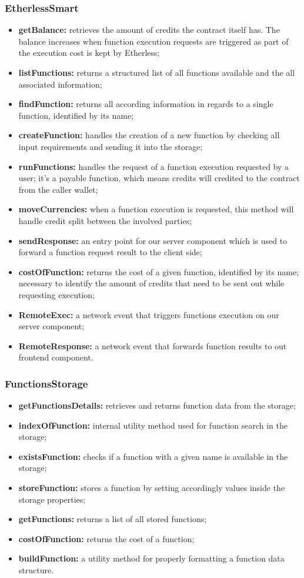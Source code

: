 \subsubsection{EtherlessSmart}
\begin{itemize}
	\item \textbf{getBalance:} retrieves the amount of credits the contract itself has. The balance increases when function execution requests are triggered as part of the execution cost is kept by Etherless;
	\item \textbf{listFunctions:} returns a structured list of all functions available and the all associated information; 
	\item \textbf{findFunction:} returns all according information in regards to a single function, identified by its name; 
	\item \textbf{createFunction:} handles the creation of a new function by checking all input requirements and sending it into the storage;
	\item \textbf{runFunctions:} handles the request of a function execution requested by a user; it's a payable function, which means credits will credited to the contract from the caller wallet;
	\item \textbf{moveCurrencies:} when a function execution is requested, this method will handle credit split between the involved parties;
	\item \textbf{sendResponse:} an entry point for our server component which is used to forward a function request result to the client side;
	\item \textbf{costOfFunction:} returns the cost of a given function, identified by its name; necessary to identify the amount of credits that need to be sent out while requesting execution;
	\item \textbf{RemoteExec:} a network event that triggers functions execution on our server component;
	\item \textbf{RemoteResponse:} a network event that forwards function results to out frontend component.
\end{itemize}
\subsubsection{FunctionsStorage}
\begin{itemize}
	\item \textbf{getFunctionsDetails:} retrieves and returns function data from the storage;
	\item \textbf{indexOfFunction:} internal utility method used for function search in the storage;
	\item \textbf{existsFunction:} checks if a function with a given name is available in the storage;
	\item \textbf{storeFunction:} stores a function by setting accordingly values inside the storage properties;
	\item \textbf{getFunctions:} returns a list of all stored functions;
	\item \textbf{costOfFunction:}  returns the cost of a function;
	\item \textbf{buildFunction:} a utility method for properly formatting a function data structure.
\end{itemize}
